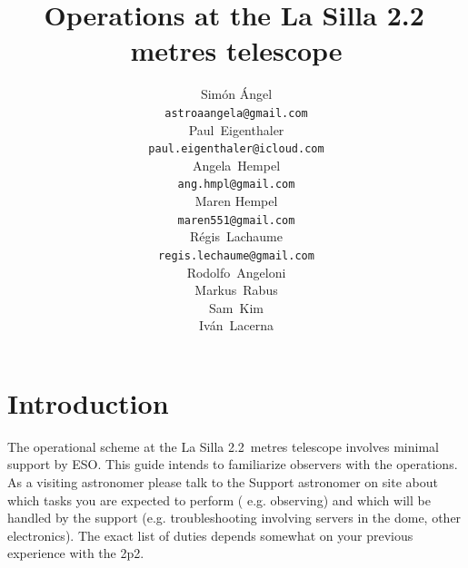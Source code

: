 \documentclass[11pt,fleqn,a4paper]{book}
\begin{document}
%
% 
\title{Operations at the La Silla 2.2\,metres telescope}%
\author{
	Sim\'on \'Angel\\[5pt]
	\texttt{astroaangela@gmail.com}\\[5pt]
	Paul~Eigenthaler\\
	\texttt{paul.eigenthaler@icloud.com}\\[5pt]
	Angela~Hempel\\
	\texttt{ang.hmpl@gmail.com}\\[5pt]
	Maren Hempel\\
	\texttt{maren551@gmail.com}\\[5pt]
     R\'egis~Lachaume\\
	\texttt{regis.lechaume@gmail.com}\\[5pt]
    Rodolfo~Angeloni\\[5pt]
	Markus~Rabus\\ [5pt]
	Sam~Kim\\[5pt]
	Iv\'an~Lacerna\\[5pt]
	}%
%
\version{\today}
\maketitle

%
% 

\tableofcontents 
\cleardoublepage 

\listoffigures 
\cleardoublepage 

\listoftables
\cleardoublepage 

\listofprocedures

%
%

\chapter{Introduction}
The operational scheme at the La Silla 2.2~metres telescope involves minimal support by ESO.  This guide intends to familiarize observers with the operations. As a visiting astronomer please talk to the Support astronomer on site about which tasks you are expected to perform ( e.g. observing) and which will be handled by the support (e.g. troubleshooting involving servers in the dome, other electronics). The exact list of duties depends somewhat on your previous experience with the 2p2.
\end{document}
